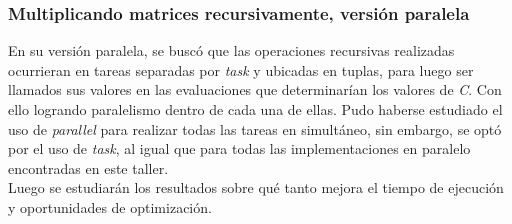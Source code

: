 \documentclass{article}
\begin{document}
\subsubsection{Multiplicando matrices recursivamente, versión paralela}

En su versión paralela, se buscó que las operaciones recursivas realizadas ocurrieran en tareas separadas por \textit{task} y ubicadas en tuplas, para luego ser llamados sus valores en las evaluaciones que determinarían los valores de \textit{C}. Con ello logrando paralelismo dentro de cada una de ellas. Pudo haberse estudiado el uso de \textit{parallel} para realizar todas las tareas en simultáneo, sin embargo, se optó por el uso de \textit{task}, al igual que para todas las implementaciones en paralelo encontradas en este taller.\\

Luego se estudiarán los resultados sobre qué tanto mejora el tiempo de ejecución y oportunidades de optimización. \\
\end{document}

